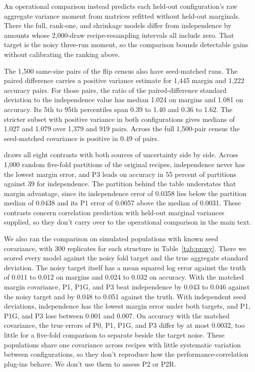 An operational comparison instead predicts each held-out configuration's raw aggregate variance moment from matrices refitted without held-out marginals. There the full, rank-one, and shrinkage models differ from independence by amounts whose 2,000-draw recipe-resampling intervals all include zero. That target is the noisy three-run moment, so the comparison bounds detectable gains without calibrating the ranking above.

The 1,500 same-size pairs of the flip census also have seed-matched runs. The paired difference carries a positive variance estimate for 1,445 margin and 1,222 accuracy pairs. For those pairs, the ratio of the paired-difference standard deviation to the independence value has median 1.024 on margins and 1.081 on accuracy. Its 5th to 95th percentiles span 0.39 to 1.40 and 0.36 to 1.62. The stricter subset with positive variance in both configurations gives medians of 1.027 and 1.079 over 1,379 and 919 pairs. Across the full 1,500-pair census the seed-matched covariance is positive in 0.49 of pairs.

 draws all eight contrasts with both sources of uncertainty side by side. Across 1,000 random five-fold partitions of the original recipes, independence never has the lowest margin error, and P3 leads on accuracy in 55 percent of partitions against 39 for independence. The partition behind the table understates that margin advantage, since its independence error of 0.0358 lies below the partition median of 0.0438 and its P1 error of 0.0057 above the median of 0.0031. These contrasts concern correlation prediction with held-out marginal variances supplied, so they don't carry over to the operational comparison in the main text.

We also ran the comparison on simulated populations with known seed covariance, with 300 replicates for each structure in Table~\ref{tab:proxy}. There we scored every model against the noisy fold target and the true aggregate standard deviation. The noisy target itself has a mean squared log error against the truth of 0.011 to 0.012 on margins and 0.024 to 0.032 on accuracy. With the matched margin covariance, P1, P1G, and P3 beat independence by 0.043 to 0.046 against the noisy target and by 0.048 to 0.051 against the truth. With independent seed deviations, independence has the lowest margin error under both targets, and P1, P1G, and P3 lose between 0.001 and 0.007. On accuracy with the matched covariance, the true errors of P0, P1, P1G, and P3 differ by at most 0.0032, too little for a five-fold comparison to separate beside the target noise. These populations share one covariance across recipes with little systematic variation between configurations, so they don't reproduce how the performance-correlation plug-ins behave. We don't use them to assess P2 or P2R.
